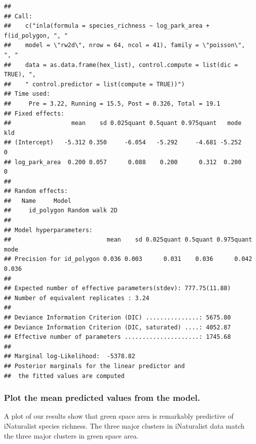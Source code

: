 \documentclass[
]{article}
\newenvironment{Shaded}{\begin{snugshade}}{\end{snugshade}}
\newcommand{\CommentTok}[1]{\textcolor[rgb]{0.56,0.35,0.01}{\textit{#1}}}
\newcommand{\NormalTok}[1]{#1}
\newcommand{\OperatorTok}[1]{\textcolor[rgb]{0.81,0.36,0.00}{\textbf{#1}}}
\newcommand{\StringTok}[1]{\textcolor[rgb]{0.31,0.60,0.02}{#1}}
\begin{document}
\begin{verbatim}
## 
## Call:
##    c("inla(formula = species_richness ~ log_park_area + f(id_polygon, ", " 
##    model = \"rw2d\", nrow = 64, ncol = 41), family = \"poisson\", ", " 
##    data = as.data.frame(hex_list), control.compute = list(dic = TRUE), ", 
##    " control.predictor = list(compute = TRUE))") 
## Time used:
##     Pre = 3.22, Running = 15.5, Post = 0.326, Total = 19.1 
## Fixed effects:
##                 mean    sd 0.025quant 0.5quant 0.975quant   mode kld
## (Intercept)   -5.312 0.350     -6.054   -5.292     -4.681 -5.252   0
## log_park_area  0.200 0.057      0.088    0.200      0.312  0.200   0
## 
## Random effects:
##   Name     Model
##     id_polygon Random walk 2D
## 
## Model hyperparameters:
##                           mean    sd 0.025quant 0.5quant 0.975quant  mode
## Precision for id_polygon 0.036 0.003      0.031    0.036      0.042 0.036
## 
## Expected number of effective parameters(stdev): 777.75(11.88)
## Number of equivalent replicates : 3.24 
## 
## Deviance Information Criterion (DIC) ...............: 5675.80
## Deviance Information Criterion (DIC, saturated) ....: 4052.87
## Effective number of parameters .....................: 1745.68
## 
## Marginal log-Likelihood:  -5378.82 
## Posterior marginals for the linear predictor and
##  the fitted values are computed
\end{verbatim}

\begin{Shaded}
\end{Shaded}

\hypertarget{plot-the-mean-predicted-values-from-the-model.}{%
\subsubsection{Plot the mean predicted values from the
model.}\label{plot-the-mean-predicted-values-from-the-model.}}

A plot of our results show that green space area is remarkably
predictive of iNaturalist species richness. The three major clusters in
iNaturalist data match the three major clusters in green space area.
\end{document}
